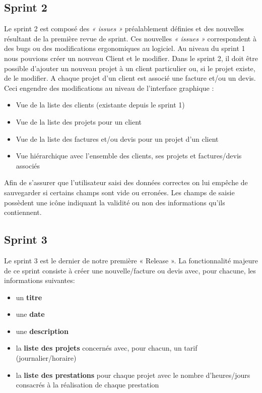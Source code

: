 \documentclass[12pt,a4paper,openany]{article}
\begin{document}
	\subsection{Sprint 2}
	Le sprint 2 est composé des \textit{« issues »} préalablement définies et des nouvelles résultant de la première revue de sprint. Ces nouvelles \textit{« issues »} correspondent à des bugs ou des modifications ergonomiques au logiciel. 
	Au niveau du sprint 1 nous pouvions créer un nouveau Client et le modifier. Dans le sprint 2, il doit être possible d'ajouter un nouveau projet à un client particulier ou, si le projet existe, de le modifier. A chaque projet d'un client est associé une facture et/ou un devis. Ceci engendre des modifications au niveau de l'interface graphique :
	\begin{itemize}
		\item Vue de la liste des clients (existante depuis le sprint 1)
		\item Vue de la liste des projets pour un client
		\item Vue de la liste des factures et/ou devis pour un projet d'un client
		\item Vue hiérarchique avec l'ensemble des clients, ses projets et factures/devis associés
	\end{itemize}
	Afin de s'assurer que l'utilisateur saisi des données correctes on lui empêche de sauvegarder si certains champs sont vide ou erronées. Les champs de saisie possèdent une icône indiquant la validité ou non des informations qu'ils contiennent. 
	
	\subsection{Sprint 3}
	Le sprint 3 est le dernier de notre première « Release ». La fonctionnalité majeure de ce sprint consiste à créer une nouvelle/facture ou devis avec, pour chacune, les informations suivantes:

	\begin{itemize}
		\item un \textbf{titre}
		\item une \textbf{date}
		\item une \textbf{description}
		\item la \textbf{liste des projets} concernés avec, pour chacun, un tarif (journalier/horaire)
		\item la \textbf{liste des prestations} pour chaque projet avec le nombre d'heures/jours consacrés à la réalisation de chaque prestation
	\end{itemize}
	
\end{document}
